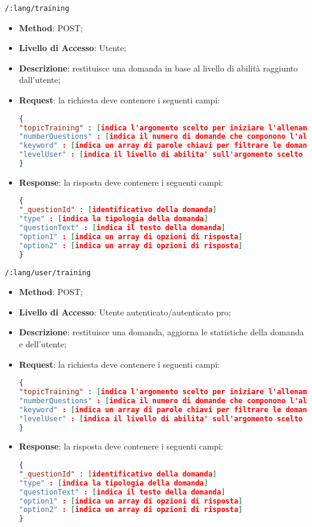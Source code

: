 	\item \texttt{/:lang/training}
		\begin{itemize}
			\item \textbf{Method}: POST;
			\item \textbf{Livello di Accesso}: Utente;
			\item \textbf{Descrizione}: restituisce una domanda in base al livello di abilità raggiunto dall'utente;
			\item \textbf{Request}: la richiesta deve contenere i seguenti campi:
\begin{lstlisting}[language=json,firstnumber=1]
{
"topicTraining" : [indica l'argomento scelto per iniziare l'allenamento]
"numberQuestions" : [indica il numero di domande che componono l'allenamento]
"keyword" : [indica un array di parole chiavi per filtrare le domande]
"levelUser" : [indica il livello di abilita' sull'argomento scelto dell'utente]
}
\end{lstlisting}
			\item \textbf{Response}: la risposta deve contenere i seguenti campi:
\begin{lstlisting}[language=json,firstnumber=1]
{
"_questionId" : [identificativo della domanda]
"type" : [indica la tipologia della domanda]
"questionText" : [indica il testo della domanda]
"option1" : [indica un array di opzioni di risposta]
"option2" : [indica un array di opzioni di risposta] 
}
\end{lstlisting}
		\end{itemize}
		
		
	\item \texttt{/:lang/user/training}
		\begin{itemize}
			\item \textbf{Method}: POST;
			\item \textbf{Livello di Accesso}: Utente autenticato/autenticato pro;
			\item \textbf{Descrizione}: restituisce una domanda, aggiorna le statistiche della domanda e dell'utente;
			\item \textbf{Request}: la richiesta deve contenere i seguenti campi:
\begin{lstlisting}[language=json,firstnumber=1]
{
"topicTraining" : [indica l'argomento scelto per iniziare l'allenamento]
"numberQuestions" : [indica il numero di domande che componono l'allenamento]
"keyword" : [indica un array di parole chiavi per filtrare le domande]
"levelUser" : [indica il livello di abilita' sull'argomento scelto dell'utente]
}
\end{lstlisting}
		\item \textbf{Response}: la risposta deve contenere i seguenti campi:
\begin{lstlisting}[language=json,firstnumber=1]
{
"_questionId" : [identificativo della domanda]
"type" : [indica la tipologia della domanda]
"questionText" : [indica il testo della domanda]
"option1" : [indica un array di opzioni di risposta]
"option2" : [indica un array di opzioni di risposta] 
}
\end{lstlisting}
	\end{itemize}